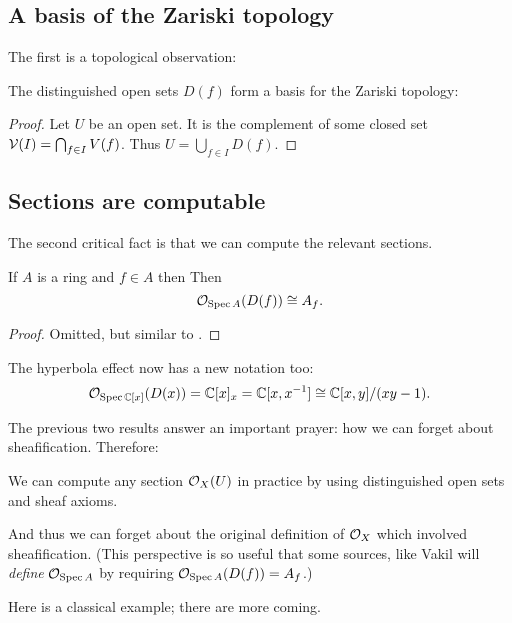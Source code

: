 \subsection{A basis of the Zariski topology}
The first is a topological observation:
\begin{theorem}
	The distinguished open sets $D(f)$
	form a basis for the Zariski topology:
\end{theorem}
\begin{proof}
	Let $U$ be an open set.
	It is the complement of some closed set
	$\mathcal V(I) = \bigcap_{f \in I} V(f)$.
	Thus $U = \bigcup_{f \in I} D(f)$.
\end{proof}

\subsection{Sections are computable}
The second critical fact is that we can compute the relevant sections.
\begin{theorem}
	If $A$ is a ring and $f \in A$ then
	Then \[ \mathcal O_{\operatorname{Spec} A}(D(f)) \cong A_f. \]
\end{theorem}
\begin{proof}
	Omitted, but similar to
	.
\end{proof}

\begin{example}
	The hyperbola effect now has a new notation too:
	\[ \mathcal O_{\operatorname{Spec} \mathbb C[x]} (D(x))
		= \mathbb C[x]_{x} = \mathbb C[x, x^{-1}]
		\cong \mathbb C[x,y] / (xy-1). \]
\end{example}

The previous two results answer an important prayer:
how we can forget about sheafification.
Therefore:
\begin{moral}
	We can compute any section $\mathcal O_X(U)$ in practice
	by using distinguished open sets and sheaf axioms.
\end{moral}
And thus we can forget about the original definition of $\mathcal O_X$
which involved sheafification.
(This perspective is so useful that some sources,
like Vakil \cite[\S4.1]{ref:vakil}
will \emph{define} $\mathcal O_{\operatorname{Spec} A}$
by requiring $\mathcal O_{\operatorname{Spec} A}(D(f)) = A_f$.)

Here is a classical example; there are more coming.
\begin{example}
\end{example}


